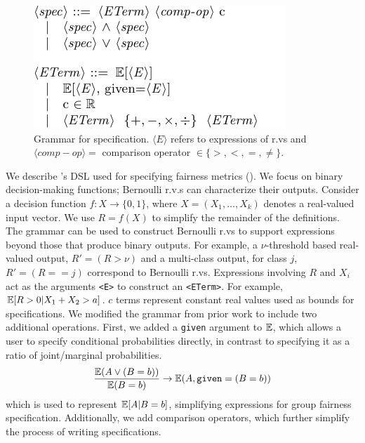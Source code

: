 \begin{figure}
    \centering
    \includegraphics{avoir/images/grammar}
    \caption{Grammar for specification. $\langle E \rangle$ refers to  expressions of r.vs and $\langle comp-op \rangle = $ comparison operator $\in \{>, <, =, \neq\}$.}
    \label{fig:grammar}
\end{figure}
We describe \AVOIRmethodname{}'s DSL used for specifying fairness metrics ().
We focus on binary decision-making functions; Bernoulli r.v.s can characterize their outputs.
Consider a decision function $f: X \rightarrow \{0, 1\}$, where $X = (X_1, \dots, X_k)$ denotes a real-valued input vector. 
We use $R = f(X)$ to simplify the remainder of the definitions. 
The grammar can be used to construct Bernoulli r.vs to support expressions beyond those that produce binary outputs.
For example, a $\nu$-threshold based real-valued output, $R' = (R > \nu)$ and a multi-class output, for class $j$,  $R' = (R == j)$ correspond to Bernoulli r.vs.
Expressions involving $R$ and $X_i$ act as the arguments \lstinline{<E>} to construct an \lstinline{<ETerm>}.
For example, $\mathbb{E}[R > 0 | X_1 + X_2 > a]$.
$c$ terms represent constant real values used as bounds for specifications.
We modified the grammar from prior work to include two additional operations. 
First, we added a \texttt{given} argument to $\mathbb{E}$, which allows a user to specify conditional probabilities directly, in contrast to specifying it as a ratio of joint/marginal probabilities. 
 \begin{align*}
     \frac{\mathbb{E}(A \vee (B=b))}{\mathbb{E}(B=b)} \rightarrow \mathbb{E}(A, \mathtt{given}=(B=b))
 \end{align*}
 which is used to represent $\mathbb{E}[A|B=b]$, simplifying expressions for group fairness specification.
Additionally, we add comparison operators, which further simplify the process of writing specifications. 


